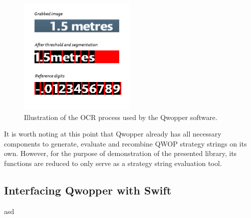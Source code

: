 \begin{figure}[ht]
	\centering
	\includegraphics[width=0.5\textwidth]{img/reading_digits.png}
	\caption[OCR process used by the Qwopper software.]{Illustration of the OCR process used by the Qwopper software. \cite{QwopEncoding}}
	\label{figure:QWOP-OCR}
\end{figure}

It is worth noting at this point that Qwopper already has all necessary components to generate, evaluate and recombine QWOP strategy strings on its own. However, for the purpose of demonstration of the presented library, its functions are reduced to only serve as a strategy string evaluation tool.

\subsection{Interfacing Qwopper with Swift}
asd
